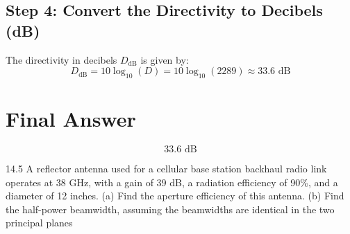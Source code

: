 \documentclass[cn,12pt]{homework}
\begin{document}
\begin{solution}
\subsection*{Step 4: Convert the Directivity to Decibels (dB)}
The directivity in decibels \( D_{\text{dB}} \) is given by:
\[ D_{\text{dB}} = 10 \log_{10}(D) = 10 \log_{10}(2289) \approx 33.6 \text{ dB} \]

\section*{Final Answer}
\[ \boxed{33.6 \text{ dB}} \]


\end{solution}
\newpage

14.5 A reflector antenna used for a cellular base station backhaul radio link operates at 38 GHz, with a gain
of 39 dB, a radiation efficiency of 90\%, and a diameter of 12 inches. (a) Find the aperture efficiency
of this antenna. (b) Find the half-power beamwidth, assuming the beamwidths are identical in the
two principal planes
\end{document}
